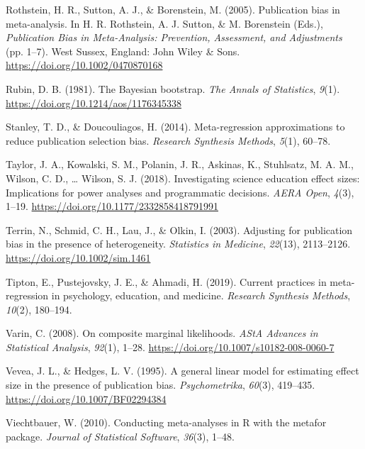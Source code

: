 \documentclass[
  man, donotrepeattitle,floatsintext]{apa7}
\newlength{\cslhangindent}
\newenvironment{CSLReferences}[2] %
 {\begin{list}{}{%
  \setlength{\itemindent}{0pt}
  \setlength{\leftmargin}{0pt}
  \setlength{\parsep}{0pt}
  \ifodd #1
   \setlength{\leftmargin}{\cslhangindent}
   \setlength{\itemindent}{-1\cslhangindent}
  \fi
  \setlength{\itemsep}{#2\baselineskip}}}
 {\end{list}}
\begin{document}
\begin{CSLReferences}{1}{0}
Rothstein, H. R., Sutton, A. J., \& Borenstein, M. (2005). Publication bias in meta-analysis. In H. R. Rothstein, A. J. Sutton, \& M. Borenstein (Eds.), \emph{Publication {Bias} in {Meta-Analysis}: {Prevention}, {Assessment}, and {Adjustments}} (pp. 1--7). {West Sussex, England}: {John Wiley \& Sons}. \url{https://doi.org/10.1002/0470870168}

Rubin, D. B. (1981). The {Bayesian} bootstrap. \emph{The Annals of Statistics}, \emph{9}(1). \url{https://doi.org/10.1214/aos/1176345338}

Stanley, T. D., \& Doucouliagos, H. (2014). Meta-regression approximations to reduce publication selection bias. \emph{Research Synthesis Methods}, \emph{5}(1), 60--78.

Taylor, J. A., Kowalski, S. M., Polanin, J. R., Askinas, K., Stuhlsatz, M. A. M., Wilson, C. D., \ldots{} Wilson, S. J. (2018). Investigating science education effect sizes: Implications for power analyses and programmatic decisions. \emph{AERA Open}, \emph{4}(3), 1--19. \url{https://doi.org/10.1177/2332858418791991}

Terrin, N., Schmid, C. H., Lau, J., \& Olkin, I. (2003). Adjusting for publication bias in the presence of heterogeneity. \emph{Statistics in Medicine}, \emph{22}(13), 2113--2126. \url{https://doi.org/10.1002/sim.1461}

Tipton, E., Pustejovsky, J. E., \& Ahmadi, H. (2019). Current practices in meta-regression in psychology, education, and medicine. \emph{Research Synthesis Methods}, \emph{10}(2), 180--194.

Varin, C. (2008). On composite marginal likelihoods. \emph{AStA Advances in Statistical Analysis}, \emph{92}(1), 1--28. \url{https://doi.org/10.1007/s10182-008-0060-7}

Vevea, J. L., \& Hedges, L. V. (1995). A general linear model for estimating effect size in the presence of publication bias. \emph{Psychometrika}, \emph{60}(3), 419--435. \url{https://doi.org/10.1007/BF02294384}

Viechtbauer, W. (2010). {Conducting meta-analyses in R with the metafor package}. \emph{Journal of Statistical Software}, \emph{36}(3), 1--48.


\end{CSLReferences}
\end{document}
